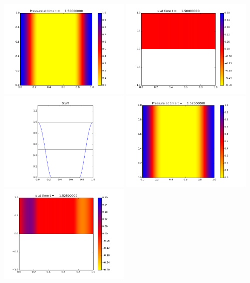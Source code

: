 \documentclass[11pt]{article}
\begin{document}
\vskip 10pt 
\includegraphics[width=0.475\textwidth]{frame0060fig0.png}
\includegraphics[width=0.475\textwidth]{frame0060fig1.png}
\vskip 10pt 
\includegraphics[width=0.475\textwidth]{frame0060fig3.png}
\vskip 10pt 
\includegraphics[width=0.475\textwidth]{frame0061fig0.png}
\includegraphics[width=0.475\textwidth]{frame0061fig1.png}
\end{document}
